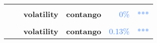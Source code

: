 \documentclass[
  authoryear,
  preprint,
  3p]{elsarticle}
\begin{document}
\begin{longtable}[t]{>{}l>{}l>{}l>{}l>{}r>{}r}
\textbf{\cellcolor{gray!10}{}} & \textbf{\cellcolor{gray!10}{crisis}} & \textbf{\cellcolor{gray!10}{mean}} & \textbf{\cellcolor{gray!10}{backwardation}} & \textcolor[HTML]{4285f4}{\cellcolor{gray!10}{46.83\%}} & \textcolor[HTML]{4285f4}{\cellcolor{gray!10}{}}\\
\textbf{} & \textbf{} & \textbf{volatility} & \textbf{contango} & \textcolor[HTML]{4285f4}{0\%} & \textcolor[HTML]{4285f4}{***}\\
\textbf{\cellcolor{gray!10}{}} & \textbf{\cellcolor{gray!10}{post-crisis}} & \textbf{\cellcolor{gray!10}{mean}} & \textbf{\cellcolor{gray!10}{backwardation}} & \textcolor[HTML]{4285f4}{\cellcolor{gray!10}{1.37\%}} & \textcolor[HTML]{4285f4}{\cellcolor{gray!10}{**}}\\
\addlinespace
\textbf{} & \textbf{} & \textbf{volatility} & \textbf{contango} & \textcolor[HTML]{4285f4}{0.13\%} & \textcolor[HTML]{4285f4}{***}\\
\bottomrule

\end{longtable}

\endgroup{}

\newpage

\begingroup\fontsize{7}{9}\selectfont
\end{document}
